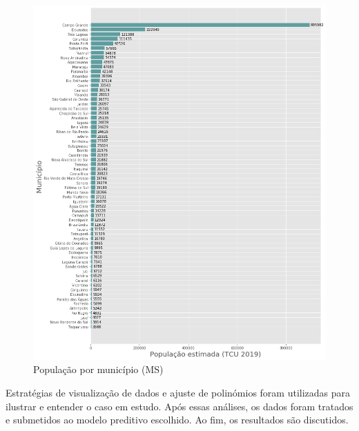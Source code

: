 \documentclass[12pt]{article}
\begin{document}
\begin{figure}[!htb]
  \centering
  \includegraphics[width=1\textwidth]{figs/pop_por_municipio.png}
  \caption{População por município (MS)}
  \label{fig:popuMuniMS}
  \end{figure}

  Estratégias de visualização de dados e ajuste de polinómios foram utilizadas para ilustrar e entender o caso em estudo. Após essas análises, os dados foram tratados e submetidos ao modelo preditivo escolhido. Ao fim, os resultados são discutidos.
\end{document}
